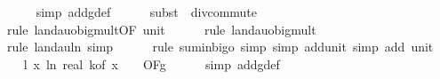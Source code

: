 \begin{isabellebody}
\ \ \ \ \isamarkupfalse%
\ {\isacharparenleft}{\kern0pt}simp\ add{\isacharcolon}{\kern0pt}g{}{\isacharunderscore}{\kern0pt}def{\isacharparenright}{\kern0pt}\isanewline
\ \ \ \ \isamarkupfalse%
\ {\isacharparenleft}{\kern0pt}subst\ {\isacharparenleft}{\kern0pt}{}{\isacharparenright}{\kern0pt}\ div{\isacharunderscore}{\kern0pt}commute{\isacharparenright}{\kern0pt}\isanewline
\ \ \ \ \isamarkupfalse%
\ {\isacharparenleft}{\kern0pt}rule\ landau{\isacharunderscore}{\kern0pt}o{\isachardot}{\kern0pt}big{\isacharunderscore}{\kern0pt}mult{\isacharunderscore}{\kern0pt}{}{\isacharprime}{\kern0pt}{\isacharbrackleft}{\kern0pt}OF\ unit{\isacharunderscore}{\kern0pt}{}{\isacharbrackright}{\kern0pt}{\isacharparenright}{\kern0pt}\isanewline
\ \ \ \ \isamarkupfalse%
\ {\isacharparenleft}{\kern0pt}rule\ landau{\isacharunderscore}{\kern0pt}o{\isachardot}{\kern0pt}big{\isacharunderscore}{\kern0pt}mult{\isacharunderscore}{\kern0pt}{}{\isacharparenright}{\kern0pt}\isanewline
\ \ \ \ \ \isamarkupfalse%
\ {\isacharparenleft}{\kern0pt}rule\ landau{\isacharunderscore}{\kern0pt}ln{\isacharunderscore}{\kern0pt}{}{\isacharcomma}{\kern0pt}\ simp{\isacharparenright}{\kern0pt}\isanewline
\ \ \ \ \isamarkupfalse%
\ {\isacharparenleft}{\kern0pt}rule\ sum{\isacharunderscore}{\kern0pt}in{\isacharunderscore}{\kern0pt}bigo{\isacharcomma}{\kern0pt}\ simp{\isacharcomma}{\kern0pt}\ simp\ add{\isacharcolon}{\kern0pt}unit{\isacharunderscore}{\kern0pt}{}{\isacharcomma}{\kern0pt}\ simp\ add{\isacharcolon}{\kern0pt}\ unit{\isacharunderscore}{\kern0pt}{}{\isacharparenright}{\kern0pt}\isanewline
\isanewline
\ \ \isamarkupfalse%
\ l{}{\isacharcolon}{\kern0pt}\ {\isachardoublequoteopen}{\isacharparenleft}{\kern0pt}{\isasymlambda}x{\isachardot}{\kern0pt}\ ln\ {\isacharparenleft}{\kern0pt}real\ {\isacharparenleft}{\kern0pt}k{\isacharunderscore}{\kern0pt}of\ x{\isacharparenright}{\kern0pt}\ {\isacharplus}{\kern0pt}\ {}{\isacharparenright}{\kern0pt}{\isacharparenright}{\kern0pt}\ {\isasymin}\ O{\isacharbrackleft}{\kern0pt}{\isacharquery}{\kern0pt}F{\isacharbrackright}{\kern0pt}{\isacharparenleft}{\kern0pt}g{\isacharparenright}{\kern0pt}{\isachardoublequoteclose}\isanewline
\ \ \ \ \isamarkupfalse%
\ {\isacharparenleft}{\kern0pt}simp\ add{\isacharcolon}{\kern0pt}g{\isacharunderscore}{\kern0pt}def{\isacharparenright}{\kern0pt}\isanewline
\ \ \ \ \isamarkupfalse%

\end{isabellebody}

